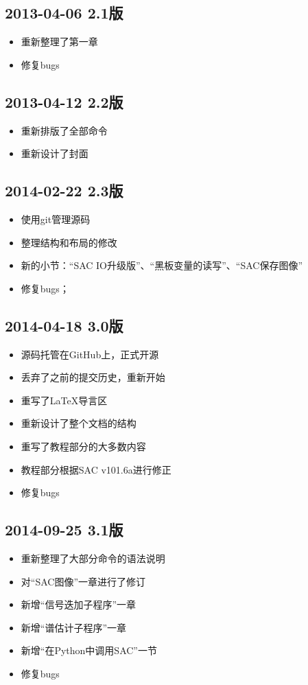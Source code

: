 \subsection*{2013-04-06 2.1版}
\begin{itemize}
\item 重新整理了第一章
\item 修复bugs
\end{itemize}

\subsection*{2013-04-12 2.2版}
\begin{itemize}
\item 重新排版了全部命令
\item 重新设计了封面
\end{itemize}

\subsection*{2014-02-22 2.3版}
\begin{itemize}
\item 使用git管理源码
\item 整理结构和布局的修改
\item 新的小节：``SAC IO升级版''、``黑板变量的读写''、``SAC保存图像''
\item 修复bugs；
\end{itemize}

\subsection*{2014-04-18 3.0版}
\begin{itemize}
\item 源码托管在GitHub上，正式开源
\item 丢弃了之前的提交历史，重新开始
\item 重写了LaTeX导言区
\item 重新设计了整个文档的结构
\item 重写了教程部分的大多数内容
\item 教程部分根据SAC v101.6a进行修正
\item 修复bugs
\end{itemize}

\subsection*{2014-09-25 3.1版}
\begin{itemize}
\item 重新整理了大部分命令的语法说明
\item 对``SAC图像''一章进行了修订
\item 新增``信号迭加子程序''一章
\item 新增``谱估计子程序''一章
\item 新增``在Python中调用SAC''一节
\item 修复bugs
\end{itemize}


